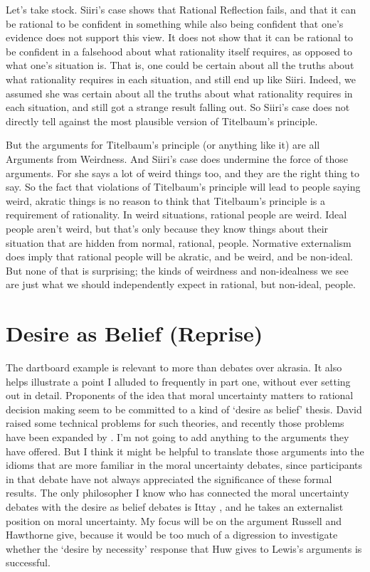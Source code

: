 Let's take stock. \gls{Siiri}'s case shows that Rational Reflection fails, and that it can be rational to be confident in something while also being confident that one's evidence does not support this view. It does not show that it can be rational to be confident in a falsehood about what rationality itself requires, as opposed to what one's situation is. That is, one could be certain about all the truths about what rationality requires in each situation, and still end up like \gls{Siiri}. Indeed, we assumed she was certain about all the truths about what rationality requires in each situation, and still got a strange result falling out. So \gls{Siiri}'s case does not directly tell against the most plausible version of Titelbaum's principle.

But the arguments for Titelbaum's principle (or anything like it) are all Arguments from Weirdness. And \gls{Siiri}'s case does undermine the force of those arguments. For she says a lot of weird things too, and they are the right thing to say. So the fact that violations of Titelbaum's principle will lead to people saying weird, akratic things is no reason to think that Titelbaum's principle is a requirement of rationality. In weird situations, rational people are weird. Ideal people aren't weird, but that's only because they know things about their situation that are hidden from normal, rational, people. Normative externalism does imply that rational people will be akratic, and be weird, and be non-ideal. But none of that is surprising; the kinds of weirdness and non-idealness we see are just what we should independently expect in rational, but non-ideal, people.

\section{Desire as Belief (Reprise)}
\label{desireasbeliefreprise}

The dartboard example is relevant to more than debates over akrasia. It also helps illustrate a point I alluded to frequently in part one, without ever setting out in detail. Proponents of the idea that moral uncertainty matters to rational decision making seem to be committed to a kind of `desire as belief' thesis. David \citet{Lewis1988b, Lewis1996a} raised some technical problems for such theories, and recently those problems have been expanded by \citet{RussellHawthorne2016}. I'm not going to add anything to the arguments they have offered. But I think it might be helpful to translate those arguments into the idioms that are more familiar in the moral uncertainty debates, since participants in that debate have not always appreciated the significance of these formal results. The only philosopher I know who has connected the moral uncertainty debates with the desire as belief debates is Ittay \citet{NissanRozen2015}, and he takes an externalist position on moral uncertainty. My focus will be on the argument Russell and Hawthorne give, because it would be too much of a digression to investigate whether the `desire by necessity' response that Huw \citet{Price1989} gives to Lewis's arguments is successful.

